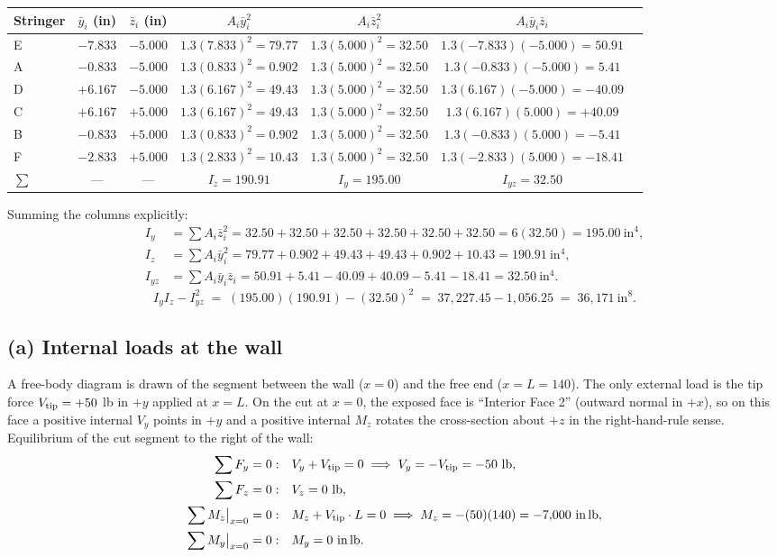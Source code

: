 \documentclass[11pt]{article}
\begin{document}
{\small
\begin{tabular}{lcccccc}
\toprule
Stringer & $\bar y_i$ (in) & $\bar z_i$ (in) & $A_i \bar y_i^2$ & $A_i \bar z_i^2$ & $A_i \bar y_i \bar z_i$\\
\midrule
E & $-7.833$ & $-5.000$ & $1.3(7.833)^2 = 79.77$  & $1.3(5.000)^2 = 32.50$ & $1.3(-7.833)(-5.000) = 50.91$\\
A & $-0.833$ & $-5.000$ & $1.3(0.833)^2 = 0.902$  & $1.3(5.000)^2 = 32.50$ & $1.3(-0.833)(-5.000) = 5.41$\\
D & $+6.167$ & $-5.000$ & $1.3(6.167)^2 = 49.43$  & $1.3(5.000)^2 = 32.50$ & $1.3(6.167)(-5.000) = -40.09$\\
C & $+6.167$ & $+5.000$ & $1.3(6.167)^2 = 49.43$  & $1.3(5.000)^2 = 32.50$ & $1.3(6.167)(5.000) = +40.09$\\
B & $-0.833$ & $+5.000$ & $1.3(0.833)^2 = 0.902$  & $1.3(5.000)^2 = 32.50$ & $1.3(-0.833)(5.000) = -5.41$\\
F & $-2.833$ & $+5.000$ & $1.3(2.833)^2 = 10.43$  & $1.3(5.000)^2 = 32.50$ & $1.3(-2.833)(5.000) = -18.41$\\
\midrule
$\sum$ & --- & --- & $I_z = 190.91$ & $I_y = 195.00$ & $I_{yz} = 32.50$\\
\bottomrule
\end{tabular}
}

Summing the columns explicitly:
\begin{align*}
I_y &= \sum A_i \bar z_i^2 = 32.50 + 32.50 + 32.50 + 32.50 + 32.50 + 32.50 = 6(32.50) = 195.00\ \text{in}^4,\\
I_z &= \sum A_i \bar y_i^2 = 79.77 + 0.902 + 49.43 + 49.43 + 0.902 + 10.43 = 190.91\ \text{in}^4,\\
I_{yz} &= \sum A_i \bar y_i \bar z_i = 50.91 + 5.41 - 40.09 + 40.09 - 5.41 - 18.41 = 32.50\ \text{in}^4.
\end{align*}
\[
I_y I_z - I_{yz}^2 \;=\; (195.00)(190.91) - (32.50)^2 \;=\; 37{,}227.45 - 1{,}056.25 \;=\; 36{,}171\ \text{in}^8.
\]

\subsection*{(a) Internal loads at the wall}

A free-body diagram is drawn of the segment between the wall ($x = 0$) and the free end ($x = L = 140$). The only external load is the tip force $V_{\rm tip} = +50$ lb in $+y$ applied at $x = L$. On the cut at $x = 0$, the exposed face is ``Interior Face 2'' (outward normal in $+x$), so on this face a positive internal $V_y$ points in $+y$ and a positive internal $M_z$ rotates the cross-section about $+z$ in the right-hand-rule sense. Equilibrium of the cut segment to the right of the wall:
\begin{align*}
\sum F_y = 0:\quad &V_y + V_{\rm tip} = 0 \;\Longrightarrow\; V_y = -V_{\rm tip} = -50\ \text{lb},\\
\sum F_z = 0:\quad &V_z = 0\ \text{lb},\\
\sum M_z\big|_{x=0} = 0:\quad &M_z + V_{\rm tip}\cdot L = 0 \;\Longrightarrow\; M_z = -(50)(140) = -7{,}000\ \text{in\,lb},\\
\sum M_y\big|_{x=0} = 0:\quad &M_y = 0\ \text{in\,lb}.
\end{align*}
\end{document}

